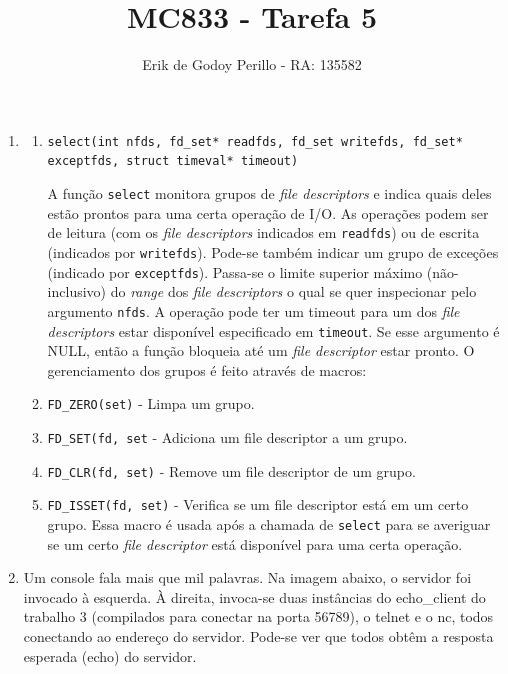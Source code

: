 \documentclass[11pt]{article}
\newcommand{\tit}[1]{\textit{#1}}
\newcommand{\ttt}[1]{\texttt{#1}}
\begin{document}
\title{MC833 - Tarefa 5}
\author{Erik de Godoy Perillo - RA: 135582}
\maketitle

\begin{enumerate}

\item 
	\begin{enumerate}
		\item \ttt{select(int nfds, fd\_set* readfds, fd\_set writefds, 
				fd\_set* exceptfds, struct timeval* timeout)}

			A função \ttt{select} monitora grupos de \tit{file descriptors} 
			e indica quais deles estão prontos para uma certa operação
			de I/O. As operações podem ser de leitura (com os \tit{file 
			descriptors} indicados em \ttt{readfds}) ou de escrita 
			(indicados por \ttt{writefds}). Pode-se também indicar um grupo de 
			exceções (indicado por \ttt{exceptfds}). Passa-se o limite superior
			máximo (não-inclusivo) do \tit{range} dos \tit{file descriptors}
			o qual se quer inspecionar pelo argumento \ttt{nfds}. A operação
			pode ter um timeout para um dos \tit{file descriptors} estar 
			disponível especificado em \ttt{timeout}. Se esse argumento
			é NULL, então a função bloqueia até um \tit{file descriptor} 
			estar pronto.
			O gerenciamento dos grupos é feito através de macros:
			
		\item \ttt{FD\_ZERO(set)} - Limpa um grupo.
		\item \ttt{FD\_SET(fd, set} - 
			Adiciona um file descriptor a um grupo.
		\item \ttt{FD\_CLR(fd, set)} - Remove um file descriptor de um grupo.
		\item \ttt{FD\_ISSET(fd, set)} - Verifica se um file descriptor está em 
			um certo grupo. Essa macro é usada após a chamada de \ttt{select}
			para se averiguar se um certo \tit{file descriptor} está disponível
			para uma certa operação.
	\end{enumerate}

	\item Um console fala mais que mil palavras.
		Na imagem abaixo, o servidor foi invocado à esquerda.
		À direita, invoca-se duas instâncias do echo\_client do trabalho
		3 (compilados para conectar na porta 56789), o telnet e o nc, todos
		conectando ao endereço do servidor. Pode-se ver que todos obtêm
		a resposta esperada (echo) do servidor.


\end{enumerate}
\end{document}
